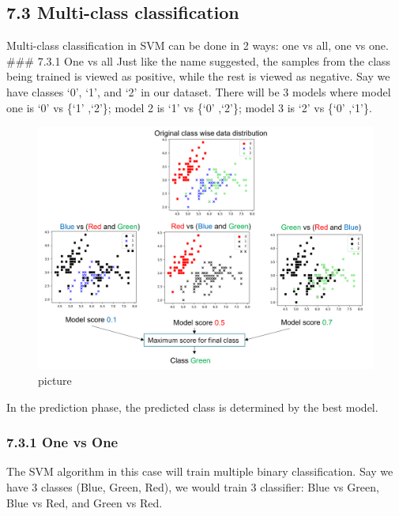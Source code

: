 \documentclass[
  letterpaper,
  DIV=11,
  numbers=noendperiod]{scrartcl}
\begin{document}
\subsection{7.3 Multi-class
classification}\label{multi-class-classification}

Multi-class classification in SVM can be done in 2 ways: one vs all, one
vs one. \#\#\# 7.3.1 One vs all Just like the name suggested, the
samples from the class being trained is viewed as positive, while the
rest is viewed as negative. Say we have classes `0', `1', and `2' in our
dataset. There will be 3 models where model one is `0' vs \{`1' ,`2'\};
model 2 is `1' vs \{`0' ,`2'\}; model 3 is `2' vs \{`0' ,`1'\}.

\begin{figure}[H]

{\centering \includegraphics{9.png}

}

\caption{picture}

\end{figure}%

In the prediction phase, the predicted class is determined by the best
model.

\subsubsection{7.3.1 One vs One}\label{one-vs-one}

The SVM algorithm in this case will train multiple binary
classification. Say we have 3 classes (Blue, Green, Red), we would train
3 classifier: Blue vs Green, Blue vs Red, and Green vs Red.
\end{document}
